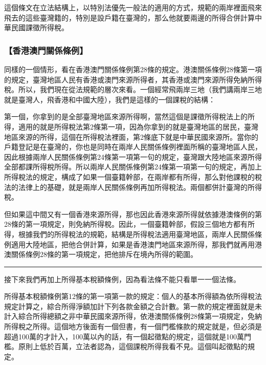 \documentclass[oneside,sub3section]{ctexbook}
\begin{document}
這個條文在立法結構上，以特別法優先一般法的適用的方式，規範的兩岸裡面飛來飛去的這些臺灣籍的，特別是設戶籍在臺灣的，那么他就要兩邊的所得合併計算中華民國課徵所得稅。

\hypertarget{ux9999ux6e2fux6fb3ux9580ux95dcux4fc2ux689dux4f8b}{%
\subsubsection{【香港澳門關係條例】}\label{ux9999ux6e2fux6fb3ux9580ux95dcux4fc2ux689dux4f8b}}

同樣的一個情形，看在香港澳門關係條例第28條的規定。港澳關係條例28條第一項的規定，臺灣地區人民有香港或澳門來源所得者，其香港或澳門來源所得免納所得稅。所以，我們現在從法規範的層次來看。一個經常飛兩岸三地（我們講兩岸三地就是臺灣人，飛香港和中國大陸），我們是這樣的一個課稅的結構：

第一個，你拿到的是全部臺灣地區來源所得啊，當然這個是課徵所得稅法上的所得，適用的就是所得稅法第2條第一項，因為你拿到的就是臺灣地區的居民，臺灣地區來源的所得，這個在所得稅法裡面，第2條底下就是中華民國來源所。當你的戶籍登記是在臺灣的，你也是同時在兩岸人民關係條例裡面所稱的臺灣地區人民，因此根據兩岸人民關係條例第24條第一項第一句的規定，臺灣跟大陸地區來源所得全部都課所得稅所得。所以兩岸人民關係條例第24條第一項第一句的規定，再加上所得稅法的規定，構成了如果一個臺籍幹部，在兩岸都有所得，那么對他課稅的稅法的法律上的基礎，就是兩岸人民關係條例再加所得稅法。兩個都併計臺灣的所得稅。

但如果這中間又有一個香港來源所得，那也因此香港來源所得就依據港澳條例的第28條的第一項規定，則免納所得稅。因此，一個臺籍幹部，假設三個地方都有所得，根據我們的所得稅法的規範，結構是所得稅法適用臺灣地區，兩岸人民關係條例適用大陸地區，把他合併計算，如果是香港澳門地區來源所得，那我們就再用港澳關係條例28條的第一項規定，把他排斥在境內所得的範圍。

\begin{center}\rule{0.5\linewidth}{0.5pt}\end{center}

接下來我們再加上所得基本稅額條例，因為看法條不能只看單一一個法條。

所得基本稅額條例第12條的第一項第一款的規定：個人的基本所得額為依所得稅法規定計算之，綜合所得淨額加計下列各款金額之合計數。第一款的規定裡面就是未計入綜合所得總額之非中華民國來源所得，依港澳關係條例28條第一項規定，免納所得稅之所得。這個地方後面有一個但書，有一個門檻條款的規定就是，但必須是超過100萬的才計入，100萬以內的話，有一個起徵點的規定，這個就是100萬門檻。原則上低於百萬，立法者認為，這個課稅所得我看不見。這個叫起徵點的規定。
\end{document}
